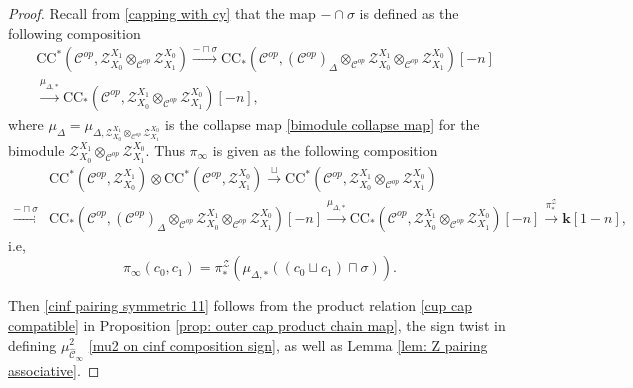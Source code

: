 \documentclass[11pt]{amsproc}
\def\K{{\mathbf{k}}}
\def\cZ{\mathcal{Z}}
\def\cc{\mathcal{C}}
\def\r#1{\mathrm{#1}}
\def\D{\Delta}
\def\cinf{\widehat{\cc}_{\infty}}
\theoremstyle{remark}
\numberwithin{equation}{section}
\begin{document}
\begin{proof}
Recall from \eqref{capping with cy} that the map $-\cap \sigma$ is defined as the following composition
\begin{equation}
\begin{split}
& \r{CC}^{*}(\cc^{op}, \cZ_{X_{0}}^{X_{1}} \otimes_{\cc^{op}} \cZ_{X_{1}}^{X_{0}}) \stackrel{- \sqcap \sigma}\to \r{CC}_{*}(\cc^{op},   (\cc^{op})_{\D} \otimes_{\cc^{op}} \cZ_{X_{0}}^{X_{1}} \otimes_{\cc^{op}} \cZ_{X_{1}}^{X_{0}})[-n]\\
& \stackrel{\mu_{\D, *}}\to \r{CC}_{*}(\cc^{op}, \cZ_{X_{0}}^{X_{1}} \otimes_{\cc^{op}} \cZ_{X_{1}}^{X_{0}})[-n],
\end{split}
\end{equation}
where $\mu_{\D} = \mu_{\D, \cZ_{X_{0}}^{X_{1}} \otimes_{\cc^{op}} \cZ_{X_{1}}^{X_{0}}}$ is the collapse map \eqref{bimodule collapse map} for the bimodule $\cZ_{X_{0}}^{X_{1}} \otimes_{\cc^{op}} \cZ_{X_{1}}^{X_{0}}$.
Thus $\pi_{\infty}$ is given as the following composition
\begin{equation}
\begin{split}
& \r{CC}^{*}(\cc^{op}, \cZ_{X_{0}}^{X_{1}}) \otimes \r{CC}^{*}(\cc^{op}, \cZ_{X_{1}}^{X_{0}}) \stackrel{\sqcup}\to \r{CC}^{*}(\cc^{op}, \cZ_{X_{0}}^{X_{1}} \otimes_{\cc^{op}} \cZ_{X_{1}}^{X_{0}}) \\
 \stackrel{- \sqcap \sigma}\to & \r{CC}_{*}(\cc^{op}, (\cc^{op})_{\D} \otimes_{\cc^{op}} \cZ_{X_{0}}^{X_{1}} \otimes_{\cc^{op}} \cZ_{X_{1}}^{X_{0}})[-n]
 \stackrel{\mu_{\D, *}}\to \r{CC}_{*}(\cc^{op}, \cZ_{X_{0}}^{X_{1}} \otimes_{\cc^{op}} \cZ_{X_{1}}^{X_{0}})[-n] \stackrel{\pi^{\cZ}_{*}}\to \K[1-n],
\end{split}
\end{equation}
i.e, 
\begin{equation}\label{pairing on cinf as composition}
\pi_{\infty}(c_{0}, c_{1}) = \pi^{\cZ}_{*}( \mu_{\D, *}( (c_{0} \sqcup c_{1}) \sqcap \sigma )).
\end{equation}

Then \eqref{cinf pairing symmetric 11} follows from the product relation \eqref{cup cap compatible} in Proposition \ref{prop: outer cap product chain map},
the sign twist in defining $\mu^{2}_{\cinf}$ \eqref{mu2 on cinf composition sign},
as well as Lemma \ref{lem: Z pairing associative}.
\end{proof}
\end{document}
